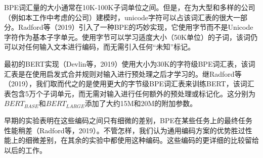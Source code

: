 \documentclass[lang=cn,11pt,a4paper,twocolumn]{elegantpaper}
\begin{document}
BPE词汇量的大小通常在10K-100K子词单位之间。但是，在为大型和多样的公司（例如本工作中考虑的公司）建模时，unicode字符可以占该词汇表的很大一部分。Radford等（2019）引入了一种BPE的巧妙实现，它使用字节而不是Unicode字符作为基本子字单元。使用字节可以学习适度大小（50K单位）的子词，该词仍可以对任何输入文本进行编码，而无需引入任何“未知”标记。

最初的BERT实现（Devlin等，2019）使用大小为30K的字符级BPE词汇表，该词汇表是在使用启发式合并规则对输入进行预处理之后才学习的。继Radford等（2019），我们取而代之的是使用更大的字节级BPE词汇表来训练BERT，该词汇表包含5万个子词单元，而无需对输入进行任何额外的预处理或标记化。这分别为$BERT_{BASE}$和$BERT_{LARGE}$添加了大约15M和20M的附加参数。

早期的实验表明在这些编码之间只有细微的差别，BPE在某些任务上的最终任务性能稍差（Radford等，2019）。不管怎样，我们认为通用编码方案的优势胜过性能上的细微差别，在其余的实验中都使用这种编码。这些编码的更详细的比较留给以后的工作。
\end{document}
